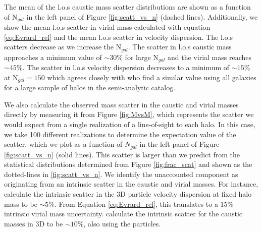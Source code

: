 \documentclass[iop]{emulateapj}
\begin{document}
The mean of the l.o.s caustic mass scatter distributions are shown as a function of N$_{gal}$ in the left panel of Figure \ref{fig:scatt_vs_n} (dashed lines). Additionally, we show the mean l.o.s scatter in virial mass calculated with equation \ref{eq:Evrard_rel} and the mean l.o.s scatter in velocity dispersion.  The l.o.s scatters decrease as we increase the N$_{gal}$. The scatter in l.o.s caustic mass approaches a minimum value of $\sim 30\%$ for large N$_{gal}$ and the virial mass reaches $\sim 45\%$.  The scatter in l.o.s velocity dispersion decreases to a minimum of $\sim 15\%$ at N$_{gal} = 150$ which agrees closely with \citet{Saro12} who find a similar value using all galaxies for a large sample of halos in the \citet{Delucia07} semi-analytic catalog.

We also calculate the observed mass scatter in the caustic and virial masses directly by measuring it from Figure \ref{fig:MvsM}, which represents the scatter we would expect from a single realization of a line-of-sight to each halo. In this case, we take 100 different realizations to determine the expectation value of the scatter, which we plot as a function of $N_{gal}$ in the left panel of Figure \ref{fig:scatt_vs_n}  (solid lines). This scatter is larger than we predict from the statistical distributions determined from Figure \ref{fig:frac_scat} and shown as the dotted-lines in  \ref{fig:scatt_vs_n}. We identify the unaccounted component as originating from an intrinsic scatter in the caustic and virial masses. For instance, \citet{Evrard08} calculate the intrinsic scatter in the 3D particle velocity dispersion at fixed halo mass to be $\sim 5\%$. From Equation \ref{eq:Evrard_rel}, this translates to a 15\% intrinsic virial mass uncertainty. \citet{Gifford13b} calculate the intrinsic scatter for the caustic masses in 3D to be $\sim 10\%$, also using the particles. 

\begin{figure*}
\caption{{\bf Left}: The scatter in virial mass, caustic mass, and velocity dispersion as a function of N$_{gal}$. The solid lines represent the observed log scatter for a single line-of-sight to 100 halos from Figure \ref{fig:MvsM}. The dotted lines are the statistical representation of the line-of-sight scatter from Figure \ref{fig:frac_scat}-bottom. {\bf Right}: The solid lines are the same observed scatter (left), but are compared with the predicted mass scatters based on the summation in quadrature of the line-of-sight statistical scatters with the intrinsic 3D mass scatter.  \label{fig:scatt_vs_n}}
\end{figure*}
\end{document}

